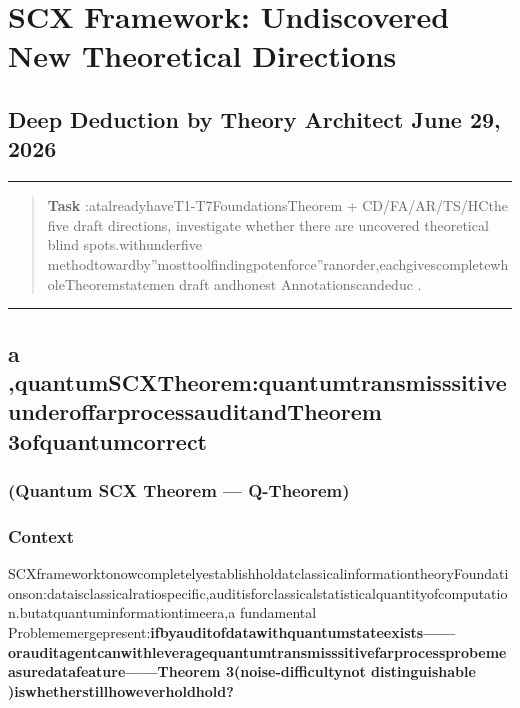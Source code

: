 \documentclass[
  12pt,
]{article}
\author{SCX}
\date{2026}
\begin{document}
\section{SCX Framework: Undiscovered New Theoretical Directions}\label{scxux6846ux67b6ux672aux88abux53d1ux73b0ux7684ux65b0ux7406ux8bbaux65b9ux5411}

\subsection{Deep Deduction by Theory Architect \textbar{}
June 29, 2026}\label{ux7406ux8bbaux67b6ux6784ux5e08ux6df1ux5ea6ux63a8ux6f14-2026ux5e746ux670829ux65e5}

\begin{center}\rule{0.5\linewidth}{0.5pt}\end{center}

\begin{quote}
\textbf{Task }:atalreadyhaveT1-T7FoundationsTheorem +
CD/FA/AR/TS/HCthe five draft directions, investigate whether there are uncovered theoretical blind spots.withunderfive methodtowardby''mosttoolfindingpotenforce''ranorder,eachgivescompletewholeTheoremstatemen draft andhonest Annotationscandeduc .
\end{quote}

\begin{center}\rule{0.5\linewidth}{0.5pt}\end{center}

\subsection{a ,quantumSCXTheorem:quantumtransmisssitiveunderoffarprocessauditandTheorem
3ofquantumcorrect }\label{ux4e00ux91cfux5b50scxux5b9aux7406ux91cfux5b50ux4f20ux611fux4e0bux7684ux8fdcux7a0bux5ba1ux8ba1ux4e0etheorem-3ux7684ux91cfux5b50ux4feeux6b63}

\subsubsection{(Quantum SCX Theorem ---
Q-Theorem)}\label{quantum-scx-theorem-q-theorem}

\subsubsection{Context}\label{ux8bedux5883}

SCXframeworktonowcompletelyestablishholdatclassicalinformationtheoryFoundationson:dataisclassicalratiospecific,auditisforclassicalstatisticalquantityofcomputation.butatquantuminformationtimeera,a  fundamental Problememergepresent:\textbf{ifbyauditofdatawithquantumstateexists------orauditagentcanwithleveragequantumtransmisssitivefarprocessprobemeasuredatafeature------Theorem
3(noise-difficultynot distinguishable )iswhetherstillhoweverholdhold?}
\end{document}

